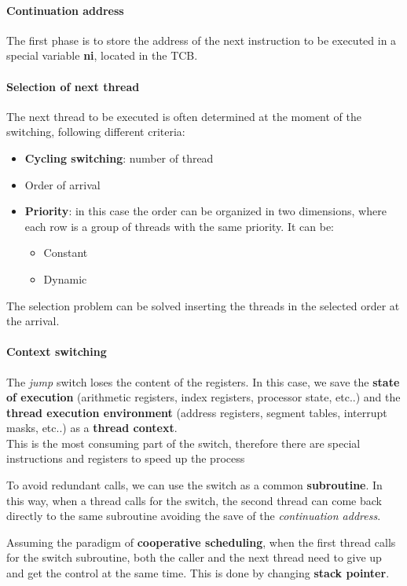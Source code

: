\paragraph{Continuation address} The first phase is to store the address of the next instruction to be executed in a special variable \textbf{ni}, located in the TCB.
\paragraph{Selection of next thread} The next thread to be executed is often determined at the moment of the switching, following different criteria:
\begin{itemize}
	\item \textbf{Cycling switching}: number of thread
	\item Order of arrival
	\item \textbf{Priority}: in this case the order can be organized in two dimensions, where each row is a group of threads with the same priority. It can be: 
	\begin{itemize}
		\item Constant
		\item Dynamic
	\end{itemize}
\end{itemize}
The selection problem can be solved inserting the threads in the selected order at the arrival.

\paragraph{Context switching} The \textit{jump} switch loses the content of the registers. In this case, we save the \textbf{state of execution} (arithmetic registers, index registers, processor state, etc..) and the \textbf{thread execution environment} (address registers, segment tables, interrupt masks, etc..) as a \textbf{thread context}.\\
This is the most consuming part of the switch, therefore there are special instructions and registers to speed up the process

\begin{observation}[Subroutine]
	To avoid redundant calls, we can use the switch as a common \textbf{subroutine}. In this way, when a thread calls for the switch, the second thread can come back directly to the same subroutine avoiding the save of the \textit{continuation address}.
\end{observation}

\begin{observation}
	Assuming the paradigm of \textbf{cooperative scheduling}, when the first thread calls for the switch subroutine, both the caller and the next thread need to give up and get the control at the same time. This is done by changing \textbf{stack pointer}.
\end{observation}

